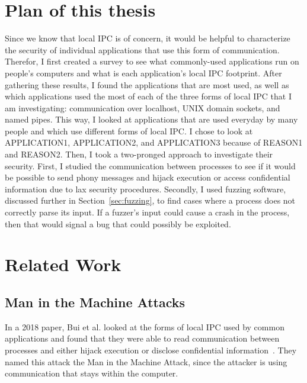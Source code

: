 \section{Plan of this thesis}
\label{sec:planOfThesis}
Since we know that local IPC is of concern, it would be helpful to characterize the security of individual applications that use this form of communication.  Therefor, I first created a survey to see what commonly-used applications run on people's computers and what is each application's local IPC footprint.  After gathering these results, I found the applications that are most used, as well as which applications used the most of each of the three forms of local IPC that I am investigating: communication over localhost, UNIX domain sockets, and named pipes.  This way, I looked at applications that are used everyday by many people and which use different forms of local IPC.  I chose to look at APPLICATION1, APPLICATION2, and APPLICATION3 because of REASON1 and REASON2.  Then, I took a two-pronged approach to investigate their security.  First, I studied the communication between processes to see if it would be possible to send phony messages and hijack execution or access confidential information due to lax security procedures.  Secondly, I used fuzzing software, discussed further in Section~\ref{sec:fuzzing}, to find cases where a process does not correctly parse its input.  If a fuzzer's input could cause a crash in the process, then that would signal a bug that could possibly be exploited.


\section{Related Work}
\label{sec:relatedWork}
\subsection{Man in the Machine Attacks}
\label{sec:manInMachineAttack}
In a 2018 paper, Bui et al. looked at the forms of local IPC used by common applications and found that they were able to read communication between processes and either hijack execution or disclose confidential information~\cite{MitMa}.  They named this attack the Man in the Machine Attack, since the attacker is using communication that stays within the computer.

